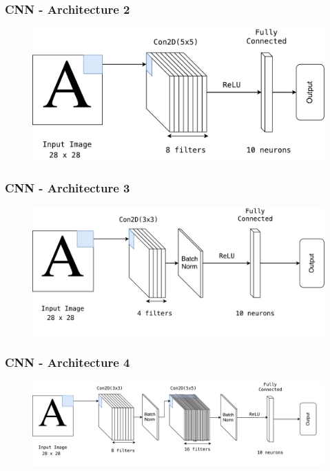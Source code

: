 \documentclass{beamer}
\begin{document}
\begin{frame}
\frametitle{CNN - Architecture 2}
	\begin{figure}[hbt]
	\vspace{2em}
  	\includegraphics[width=1\textwidth,height=0.7\textheight,keepaspectratio]{diag_2}\\
    \vspace{2em}
	\end{figure}
\end{frame}

\begin{frame}
\frametitle{CNN - Architecture 3}
	\begin{figure}[hbt]
	\vspace{2em}
  	\includegraphics[width=1\textwidth,height=0.7\textheight,keepaspectratio]{diag_3}\\
    \vspace{2em}
	\end{figure}
\end{frame}

\begin{frame}
\frametitle{CNN - Architecture 4}
	\begin{figure}[hbt]
	\vspace{2em}
  	\includegraphics[width=1\textwidth,height=0.7\textheight,keepaspectratio]{diag_4}\\
    \vspace{2em}
	\end{figure}
\end{frame}
\end{document}
